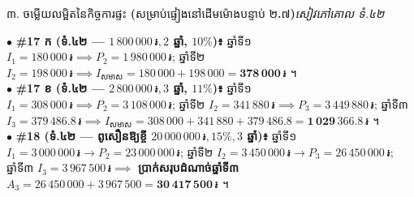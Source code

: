 \documentclass[a4paper,10pt]{article}
\newcommand{\enbf}[1]{{\TimesEn\bfseries #1}}
\newcommand{\riel}{\,\text{៛}}
\newcommand{\secstrip}[2]{%
  \vspace{3pt}%
  \begin{tcolorbox}[
    enhanced, sharp corners, colback=panelgray, colframe=black,
    boxrule=0.8pt, boxsep=0.8pt, top=2pt, bottom=2pt, left=5pt, right=5pt,
    after skip=3pt
  ]
    {\muol\fontsize{8.5pt}{12.2pt}\selectfont #1}\hfill{\fontsize{7.8pt}{10.8pt}\selectfont\textit{#2}}
  \end{tcolorbox}%
}
\begin{document}
\vspace{4pt}
\secstrip{៣. ចម្លើយលម្អិតនៃកិច្ចការផ្ទះ \enbf{(}សម្រាប់ផ្ទៀងនៅដើមម៉ោងបន្ទាប់ ២\enbf{.}៧\enbf{)}}{សៀវភៅគោល ទំ.៤២}

\begin{tcolorbox}[
  enhanced, sharp corners, colback=white, colframe=black,
  boxrule=0.8pt, boxsep=2pt, top=4pt, bottom=4pt, left=6pt, right=6pt
]
  \fontsize{8.9pt}{13.4pt}\selectfont
  $\bullet$ \textbf{\#17 ក (ទំ.៤២ — $1\,800\,000\riel, 2$ ឆ្នាំ, $10\%$)៖} ឆ្នាំទី១ $I_1 = 180\,000\riel \implies P_2 = 1\,980\,000\riel$; ឆ្នាំទី២ $I_2 = 198\,000\riel \implies I_{\text{សមាស}} = 180\,000 + 198\,000 = \mathbf{378\,000\riel}$ ។\\[2pt]
  $\bullet$ \textbf{\#17 ខ (ទំ.៤២ — $2\,800\,000\riel, 3$ ឆ្នាំ, $11\%$)៖} ឆ្នាំទី១ $I_1 = 308\,000\riel \implies P_2 = 3\,108\,000\riel$; ឆ្នាំទី២ $I_2 = 341\,880\riel \implies P_3 = 3\,449\,880\riel$; ឆ្នាំទី៣ $I_3 = 379\,486.8\riel \implies I_{\text{សមាស}} = 308\,000 + 341\,880 + 379\,486.8 = \mathbf{1\,029\,366.8\riel}$ ។\\[2pt]
  $\bullet$ \textbf{\#18 (ទំ.៤២ — ពូសឿនឱ្យខ្ចី $20\,000\,000\riel, 15\%, 3$ ឆ្នាំ)៖} ឆ្នាំទី១ $I_1 = 3\,000\,000\riel \to P_2 = 23\,000\,000\riel$; ឆ្នាំទី២ $I_2 = 3\,450\,000\riel \to P_3 = 26\,450\,000\riel$; ឆ្នាំទី៣ $I_3 = 3\,967\,500\riel \implies$ \textbf{ប្រាក់សរុបដំណាច់ឆ្នាំទី៣} $A_3 = 26\,450\,000 + 3\,967\,500 = \mathbf{30\,417\,500\riel}$ ។
\end{tcolorbox}
\end{document}
